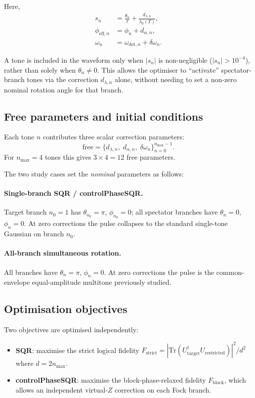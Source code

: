 \documentclass[11pt]{article}
\begin{document}
Here,
\begin{align}
s_n &= \frac{\theta_n}{\pi} + \frac{d_{\lambda,n}}{\lambda_0(T)}, \\
\phi_{\mathrm{eff},n} &= \phi_n + d_{\alpha,n}, \\
\omega_n &= \omega_{\mathrm{det},n} + \delta\omega_n.
\end{align}

A tone is included in the waveform only when $|s_n|$ is non-negligible
($|s_n| > 10^{-4}$), rather than solely when $\theta_n \ne 0$.  This
allows the optimiser to ``activate'' spectator-branch tones via the
correction $d_{\lambda,n}$ alone, without needing to set a non-zero
nominal rotation angle for that branch.

\subsection{Free parameters and initial conditions}

Each tone $n$ contributes three scalar correction parameters:
\[
\text{free} = \{d_{\lambda,n},\; d_{\alpha,n},\; \delta\omega_n\}_{n=0}^{n_{\max}-1}.
\]
For $n_{\max}=4$ tones this gives $3\times 4 = 12$ free parameters.

The two study cases set the \emph{nominal} parameters as follows:

\paragraph{Single-branch SQR / controlPhaseSQR.}
Target branch $n_0=1$ has $\theta_{n_0}=\pi$, $\phi_{n_0}=0$; all
spectator branches have $\theta_n=0$, $\phi_n=0$.  At zero corrections
the pulse collapses to the standard single-tone Gaussian on branch $n_0$.

\paragraph{All-branch simultaneous rotation.}
All branches have $\theta_n=\pi$, $\phi_n=0$.  At zero corrections the
pulse is the common-envelope equal-amplitude multitone previously studied.

\subsection{Optimisation objectives}

Two objectives are optimised independently:
\begin{itemize}
    \item \textbf{SQR}: maximise the strict logical fidelity
    $F_{\mathrm{strict}} = |\mathrm{Tr}(U_{\mathrm{target}}^\dagger
    U_{\mathrm{restricted}})|^2 / d^2$ where $d = 2n_{\max}$.
    \item \textbf{controlPhaseSQR}: maximise the block-phase-relaxed
    fidelity $F_{\mathrm{block}}$, which allows an independent virtual-$Z$
    correction on each Fock branch.
\end{itemize}
\end{document}
